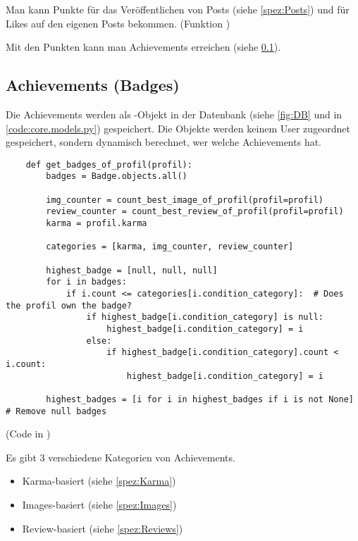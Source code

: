 Man kann Punkte für das Veröffentlichen von Posts (siehe \ref{spez:Posts}) und für
Likes auf den eigenen Posts bekommen. (Funktion )

Mit den Punkten kann man Achievements erreichen (siehe \ref{spez:Badges}).

\subsection{Achievements (Badges)} \label{spez:Badges}

Die Achievements werden als -Objekt in der Datenbank (siehe \ref{fig:DB} und in
\ref{code:core.models.py}) gespeichert. Die Objekte werden keinem User
zugeordnet gespeichert, sondern dynamisch berechnet, wer welche Achievements
hat.

\begin{lstlisting}
    def get_badges_of_profil(profil):
        badges = Badge.objects.all()

        img_counter = count_best_image_of_profil(profil=profil)
        review_counter = count_best_review_of_profil(profil=profil)
        karma = profil.karma

        categories = [karma, img_counter, review_counter]

        highest_badge = [null, null, null]
        for i in badges:
            if i.count <= categories[i.condition_category]:  # Does the profil own the badge?
                if highest_badge[i.condition_category] is null:
                    highest_badge[i.condition_category] = i
                else:
                    if highest_badge[i.condition_category].count < i.count:
                        highest_badge[i.condition_category] = i
        
        highest_badges = [i for i in highest_badges if i is not None]  # Remove null badges
\end{lstlisting}

(Code in )



Es gibt 3 verschiedene Kategorien von Achievements.
\begin{itemize}
    \item Karma-basiert (siehe \ref{spez:Karma})
    \item Images-basiert (siehe \ref{spez:Images})
    \item Review-basiert (siehe \ref{spez:Reviews})
\end{itemize}

